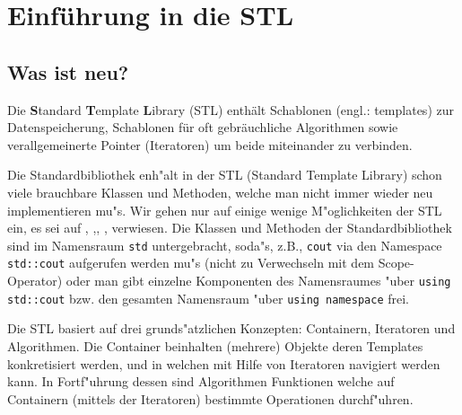 \chapter{Einführung in die STL}
\label{p:11}
%


\section{Was ist neu?}
\label{p:11.1}

Die \textbf{S}tandard  \textbf{T}emplate \textbf{L}ibrary (STL) enthält
Schablonen (engl.: templates) zur Datenspeicherung, Schablonen für
oft gebräuchliche Algorithmen sowie verallgemeinerte Pointer (Iteratoren) um
beide miteinander zu verbinden.

Die Standardbibliothek enh"alt in der STL (Standard Template Library)
schon viele brauchbare Klassen
und Methoden, welche man nicht immer wieder neu implementieren mu"s.
Wir gehen nur auf einige wenige M"oglichkeiten der STL ein,
es sei auf \cite[\S49]{Meyers:1998:ECP},  \cite[\S6.4.1]{Meyers:1997:MEC},\cite[\S10]{Yang:2001:COO},
\cite[567-711]{KirchPrinz:2002:OOP}, \cite{KuhlinsSchader:2002:DCS} verwiesen.
Die Klassen und Methoden der Standardbibliothek sind im Namensraum \texttt{std} untergebracht,
soda"s, z.B., \texttt{cout}
via den Namespace \texttt{std::cout} aufgerufen werden mu"s (nicht zu Verwechseln mit
dem Scope-Operator) oder man gibt einzelne Komponenten des Namensraumes "uber
\verb|using std::cout| bzw. den gesamten Namensraum "uber
\verb|using namespace| frei.

Die STL basiert auf drei grunds"atzlichen Konzepten:
Containern, Iteratoren und Algorithmen.
Die Container beinhalten (mehrere) Objekte deren Templates konkretisiert werden,
und in welchen mit Hilfe von Iteratoren navigiert werden kann.
In Fortf"uhrung dessen sind Algorithmen
Funktionen welche auf Containern (mittels der Iteratoren) bestimmte
Operationen durchf"uhren.

